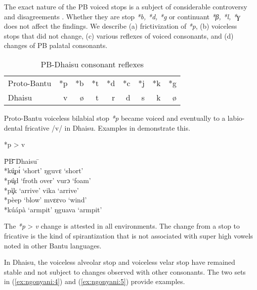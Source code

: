 \documentclass[output=paper,colorlinks,citecolor=brown]{langscibook}
\begin{document}
The exact nature of the PB voiced stops is a subject of considerable controversy and disagreements \citep{Hyman2019, Mould1972}. Whether they are stop \textit{*b, *d, *g} \citep{Guthrie1967, Meeussen1967, Meinhof1932}  or continuant \textit{*β, *l, *ɣ} \citep{Meinhof1932}  does not affect the findings. We describe (a) frictivization of \textit{*p}, (b) voiceless stops that did not change, (c) various reflexes of voiced consonants, and (d) changes of PB palatal consonants.

\begin{table}
    \caption{PB-Dhaisu consonant reflexes}
    \label{tab:ngonyani:18}
    \begin{tabular}{@{}l r r r r r r r r@{}}
         Proto-Bantu & *p & *b & *t & *d & *c & *j & *k & *g\\
         Dhaisu & v & ø & t & r & d & s & k & ø \\
    \end{tabular}
\end{table}

Proto-Bantu voiceless bilabial stop \textit{*p} became voiced and eventually to a labio-dental fricative /v/ in Dhaisu. Examples in  demonstrate this.

\ea%
	\label{ex:ngonyani:3}
	*p > v\\
    \begin{tabbing} 
        \= PB \quad\= \quad\= \quad\= \quad\= \quad\= \quad\= \quad\= \quad\= Dhaisu \quad\=  \quad\= \\
        \> *kú̧pɪ́ \> \>‘short’ \> \> \>  \> \> \> ŋguvɛ \> `short' \\
        \> *pú̧d \> \>‘froth over’ \>  \> \> \> \> \> vurɔ \> ‘foam’\\
        \> *pì̧k \> \>‘arrive’ \> \>  \> \> \> \> vika \> ‘arrive’\\
        \> *pèep \> \>‘blow’ \> \> \> \> \> \> mvɛɛvo \> ‘wind’\\
        \> *kúápà \> \>‘armpit’ \> \> \>  \> \> \> ŋguava \> ‘armpit’
    \end{tabbing}
\z

The  \textit{*p} > \textit{v}  change is attested in all environments. The change from a stop to fricative is the kind of spirantization that is not associated with super high vowels noted in other Bantu languages.

In Dhaisu, the voiceless alveolar stop and voiceless velar stop have remained stable and not subject to changes observed with other consonants. The two sets in (\ref{ex:ngonyani:4}) and (\ref{ex:ngonyani:5}) provide examples.
\end{document}
